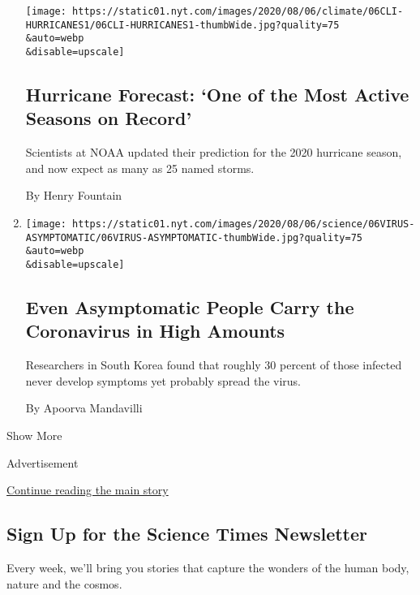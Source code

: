 \begin{enumerate}
  \texttt{[image: https://static01.nyt.com/images/2020/08/06/climate/06CLI-HURRICANES1/06CLI-HURRICANES1-thumbWide.jpg?quality=75\\\&auto=webp\\\&disable=upscale]}

  \hypertarget{hurricane-forecast-one-of-the-most-active-seasons-on-record}{%
  \subsection{Hurricane Forecast: `One of the Most Active Seasons on
  Record'}\label{hurricane-forecast-one-of-the-most-active-seasons-on-record}}

  Scientists at NOAA updated their prediction for the 2020 hurricane
  season, and now expect as many as 25 named storms.

  By Henry Fountain
\item
  \href{/2020/08/06/health/coronavirus-asymptomatic-transmission.html}{}

  \texttt{[image: https://static01.nyt.com/images/2020/08/06/science/06VIRUS-ASYMPTOMATIC/06VIRUS-ASYMPTOMATIC-thumbWide.jpg?quality=75\\\&auto=webp\\\&disable=upscale]}

  \hypertarget{even-asymptomatic-people-carry-the-coronavirus-in-high-amounts}{%
  \subsection{Even Asymptomatic People Carry the Coronavirus in High
  Amounts}\label{even-asymptomatic-people-carry-the-coronavirus-in-high-amounts}}

  Researchers in South Korea found that roughly 30 percent of those
  infected never develop symptoms yet probably spread the virus.

  By Apoorva Mandavilli
\end{enumerate}

Show More

Advertisement

\protect\hyperlink{after-mid2}{Continue reading the main story}

\hypertarget{sign-up-for-the-science-times-newsletter}{%
\subsection{Sign Up for the Science Times
Newsletter}\label{sign-up-for-the-science-times-newsletter}}

Every week, we'll bring you stories that capture the wonders of the
human body, nature and the cosmos.

